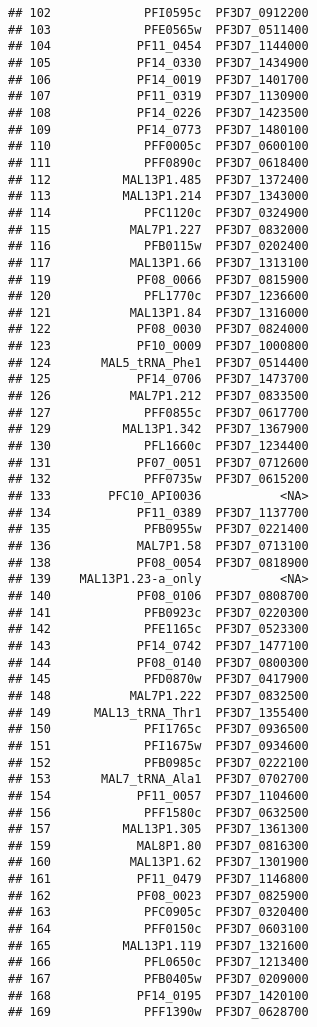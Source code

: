 \documentclass{article}\usepackage[]{graphicx}\usepackage[]{color}
\makeatletter
\newenvironment{kframe}{%
 \def\at@end@of@kframe{}%
 \ifinner\ifhmode%
  \def\at@end@of@kframe{\end{minipage}}%
  \begin{minipage}{\columnwidth}%
 \fi\fi%
 \def\FrameCommand##1{\hskip\@totalleftmargin \hskip-\fboxsep
 \colorbox{shadecolor}{##1}\hskip-\fboxsep
     \hskip-\linewidth \hskip-\@totalleftmargin \hskip\columnwidth}%
 \MakeFramed {\advance\hsize-\width
   \@totalleftmargin\z@ \linewidth\hsize
   \@setminipage}}%
 {\par\unskip\endMakeFramed%
 \at@end@of@kframe}
\newenvironment{knitrout}{}{} %
\makeatother
\begin{document}
\begin{knitrout}
\begin{kframe}
\begin{verbatim}
## 102             PFI0595c  PF3D7_0912200
## 103             PFE0565w  PF3D7_0511400
## 104            PF11_0454  PF3D7_1144000
## 105            PF14_0330  PF3D7_1434900
## 106            PF14_0019  PF3D7_1401700
## 107            PF11_0319  PF3D7_1130900
## 108            PF14_0226  PF3D7_1423500
## 109            PF14_0773  PF3D7_1480100
## 110             PFF0005c  PF3D7_0600100
## 111             PFF0890c  PF3D7_0618400
## 112          MAL13P1.485  PF3D7_1372400
## 113          MAL13P1.214  PF3D7_1343000
## 114             PFC1120c  PF3D7_0324900
## 115           MAL7P1.227  PF3D7_0832000
## 116             PFB0115w  PF3D7_0202400
## 117           MAL13P1.66  PF3D7_1313100
## 119            PF08_0066  PF3D7_0815900
## 120             PFL1770c  PF3D7_1236600
## 121           MAL13P1.84  PF3D7_1316000
## 122            PF08_0030  PF3D7_0824000
## 123            PF10_0009  PF3D7_1000800
## 124       MAL5_tRNA_Phe1  PF3D7_0514400
## 125            PF14_0706  PF3D7_1473700
## 126           MAL7P1.212  PF3D7_0833500
## 127             PFF0855c  PF3D7_0617700
## 129          MAL13P1.342  PF3D7_1367900
## 130             PFL1660c  PF3D7_1234400
## 131            PF07_0051  PF3D7_0712600
## 132             PFF0735w  PF3D7_0615200
## 133        PFC10_API0036           <NA>
## 134            PF11_0389  PF3D7_1137700
## 135             PFB0955w  PF3D7_0221400
## 136            MAL7P1.58  PF3D7_0713100
## 138            PF08_0054  PF3D7_0818900
## 139    MAL13P1.23-a_only           <NA>
## 140            PF08_0106  PF3D7_0808700
## 141             PFB0923c  PF3D7_0220300
## 142             PFE1165c  PF3D7_0523300
## 143            PF14_0742  PF3D7_1477100
## 144            PF08_0140  PF3D7_0800300
## 145             PFD0870w  PF3D7_0417900
## 148           MAL7P1.222  PF3D7_0832500
## 149      MAL13_tRNA_Thr1  PF3D7_1355400
## 150             PFI1765c  PF3D7_0936500
## 151             PFI1675w  PF3D7_0934600
## 152             PFB0985c  PF3D7_0222100
## 153       MAL7_tRNA_Ala1  PF3D7_0702700
## 154            PF11_0057  PF3D7_1104600
## 156             PFF1580c  PF3D7_0632500
## 157          MAL13P1.305  PF3D7_1361300
## 159            MAL8P1.80  PF3D7_0816300
## 160           MAL13P1.62  PF3D7_1301900
## 161            PF11_0479  PF3D7_1146800
## 162            PF08_0023  PF3D7_0825900
## 163             PFC0905c  PF3D7_0320400
## 164             PFF0150c  PF3D7_0603100
## 165          MAL13P1.119  PF3D7_1321600
## 166             PFL0650c  PF3D7_1213400
## 167             PFB0405w  PF3D7_0209000
## 168            PF14_0195  PF3D7_1420100
## 169             PFF1390w  PF3D7_0628700

\end{verbatim}
\end{kframe}
\end{knitrout}
\end{document}
